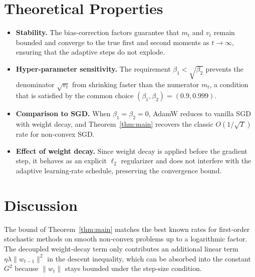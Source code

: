 \documentclass{article}
\begin{document}
\section*{Theoretical Properties}
\begin{itemize}
\item \textbf{Stability.} The bias‑correction factors guarantee that $m_{t}$ and $v_{t}$
remain bounded and converge to the true first and second moments as $t\to\infty$,
ensuring that the adaptive steps do not explode.
\item \textbf{Hyper‑parameter sensitivity.}
The requirement $\beta_{1}<\sqrt{\beta_{2}}$ prevents the denominator
$\sqrt{v_{t}}$ from shrinking faster than the numerator $m_{t}$, a condition
that is satisfied by the common choice $(\beta_{1},\beta_{2})=(0.9,0.999)$.
\item \textbf{Comparison to SGD.}
When $\beta_{1}=\beta_{2}=0$, AdamW reduces to vanilla SGD with weight decay,
and Theorem~\ref{thm:main} recovers the classic $O(1/\sqrt{T})$ rate for non‑convex SGD.
\item \textbf{Effect of weight decay.}
Since weight decay is applied before the gradient step, it behaves as an
explicit $\ell_{2}$ regularizer and does not interfere with the adaptive
learning‑rate schedule, preserving the convergence bound.
\end{itemize}

\section*{Discussion}
The bound of Theorem~\ref{thm:main} matches the best known rates for
first‑order stochastic methods on smooth non‑convex problems up to a
logarithmic factor. The decoupled weight‑decay term only contributes an
additional linear term $\eta\lambda\|w_{t-1}\|^{2}$ in the descent
inequality, which can be absorbed into the constant $G^{2}$ because
$\|w_{t}\|$ stays bounded under the step‑size condition.

\newpage
\end{document}
